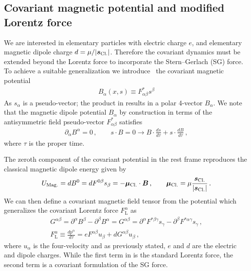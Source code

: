\subsection{Covariant magnetic potential and modified Lorentz force}
\label{sec:magpotential}
We are interested in elementary particles with electric charge $e$, and elementary magnetic dipole charge $d=\mu/|\boldsymbol{s}_\mathrm{Cl.}|$. Therefore the covariant dynamics must be extended beyond the Lorentz force to incorporate the Stern–Gerlach (SG) force. To achieve a suitable generalization we introduce~\citep{Rafelski:2017hce} the covariant magnetic potential
\begin{gather}
    \label{bpot:1}
    B_{\alpha}(x,s)\equiv F_{\alpha\beta}^{*}s^{\beta}
\end{gather}
As $s_{\alpha}$ is a pseudo-vector; the product in  results in a polar 4-vector $B_{\alpha}$. We note that the magnetic dipole potential $B_{\alpha}$ by construction in terms of the antisymmetric field pseudo-vector $F_{\alpha\beta}^{*}$ satisfies
\begin{gather}
    \label{bpot:2}
    \partial_{\alpha}B^{\alpha}=0\,,\qquad s\cdot B=0 \rightarrow B\cdot\frac{ds}{d\tau}+s\cdot\frac{dB}{d\tau}\,,
\end{gather}
where $\tau$ is the proper time.

The zeroth component of the covariant potential in the rest frame  reproduces the classical magnetic dipole energy given by
\begin{gather}
    U_\mathrm{Mag.}=dB^{0}=dF^{0\beta}s_{\beta}=-\boldsymbol{\mu}_\mathrm{Cl.}\cdot\boldsymbol{B}\,,\qquad \boldsymbol{\mu}_\mathrm{Cl.}=\mu\frac{\boldsymbol{s}_\mathrm{Cl.}}{|\boldsymbol{s}_\mathrm{Cl.}|}\,.
\end{gather}
We can then define a covariant magnetic field tensor from the potential  which generalizes the covariant Lorentz force $F_\mathrm{L}^{\alpha}$ as
\begin{gather}
    \label{LSG02}
    G^{\alpha\beta}=\partial^{\alpha}B^{\beta}-\partial^{\beta}B^{\alpha}= G^{\alpha\beta}=\partial^{\alpha}F^{*\beta\gamma}s_{\gamma}-\partial^{\beta}F^{*\alpha\gamma}s_{\gamma}\,,\\
    \label{LSG01}
    F_\mathrm{L}^{\alpha}\equiv\frac{dp^{\alpha}}{d\tau}=eF^{\alpha\beta}u_{\beta}+dG^{\alpha\beta}u_{\beta}\,,
\end{gather}
where $u_{\alpha}$ is the four-velocity and as previously stated, $e$ and $d$ are the electric and dipole charges. While the first term in  is the standard Lorentz force, the second term is a covariant formulation of the SG force.

